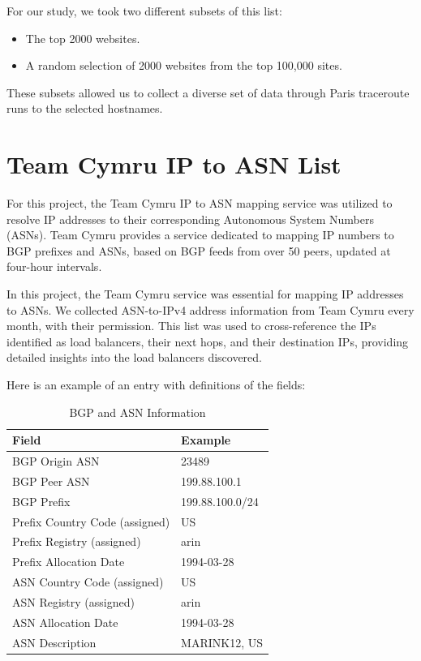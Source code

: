 \documentclass[12pt]{cwru_thesis}
\begin{document}
For our study, we took two different subsets of this list:
\begin{itemize}
    \item The top 2000 websites.
    \item A random selection of 2000 websites from the top 100,000 sites.
\end{itemize}
These subsets allowed us to collect a diverse set of data through Paris traceroute runs to the selected hostnames.

\section{Team Cymru IP to ASN List}

For this project, the Team Cymru IP to ASN mapping service was utilized to resolve IP addresses to their corresponding Autonomous System Numbers (ASNs). Team Cymru provides a  service dedicated to mapping IP numbers to BGP prefixes and ASNs, based on BGP feeds from over 50 peers, updated at four-hour intervals.



In this project, the Team Cymru service was essential for mapping IP addresses to ASNs. We collected ASN-to-IPv4 address information from Team Cymru every month, with their permission. This list was used to cross-reference the IPs identified as load balancers, their next hops, and their destination IPs, providing detailed insights into the load balancers discovered.

 Here is an example of an entry with definitions of the fields:
\begin{table}[h]
    \centering
    \begin{tabular}{|l|l|}
        \hline
        \textbf{Field} & \textbf{Example} \\
        \hline
        BGP Origin ASN & 23489 \\
        \hline
        BGP Peer ASN & 199.88.100.1 \\
        \hline
        BGP Prefix & 199.88.100.0/24 \\
        \hline
        Prefix Country Code (assigned) & US \\
        \hline
        Prefix Registry (assigned) & arin \\
        \hline
        Prefix Allocation Date & 1994-03-28 \\
        \hline
        ASN Country Code (assigned) & US \\
        \hline
        ASN Registry (assigned) & arin \\
        \hline
        ASN Allocation Date & 1994-03-28 \\
        \hline
        ASN Description & MARINK12, US \\
        \hline
    \end{tabular}
    \caption{BGP and ASN Information}
    \label{tab:bgp_asn_info}
\end{table}
\end{document}
